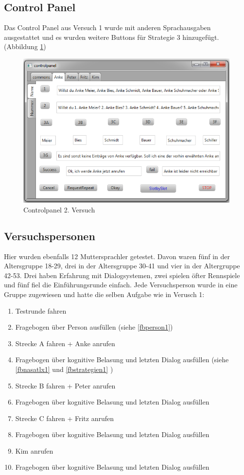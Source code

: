 \documentclass[12pt,a4paper]{scrartcl}
\begin{document}
\subsection{Control Panel}
Das Control Panel aus Versuch 1 wurde mit anderen Sprachausgaben ausgestattet und es wurden weitere Buttons für Strategie 3 hinzugefügt. (Abbildung \ref{cp2})
\begin{figure}[htbp]
\includegraphics{controlpanel2.png}
\caption{Controlpanel 2. Versuch}
\label{cp2}
\end{figure}


\subsection{Versuchspersonen}

Hier wurden ebenfalls 12 Muttersprachler getestet. Davon waren fünf in der Altersgruppe 18-29, drei in der Altersgruppe 30-41 und vier in der Altergruppe 42-53. Drei haben Erfahrung mit Dialogsystemen, zwei spielen öfter Rennspiele und fünf fiel die Einführungsrunde einfach. Jede Versuchsperson wurde in eine Gruppe zugewiesen und hatte die selben Aufgabe wie in Verusch 1: 
\begin{enumerate}
\item Testrunde fahren
\item Fragebogen über Person ausfüllen (siehe \ref{fbperson1})
\item Strecke A fahren + Anke anrufen
\item Fragebogen über kognitive Belasung und letzten Dialog ausfüllen (siehe \ref{fbnasatlx1} und \ref{fbstrategien1} )
\item Strecke B fahren + Peter anrufen
\item Fragebogen über kognitive Belasung und letzten Dialog ausfüllen
\item Strecke C fahren + Fritz anrufen
\item Fragebogen über kognitive Belasung und letzten Dialog ausfüllen 
\item Kim anrufen
\item Fragebogen über kognitive Belasung und letzten Dialog ausfüllen 
\end{enumerate}
\end{document}
